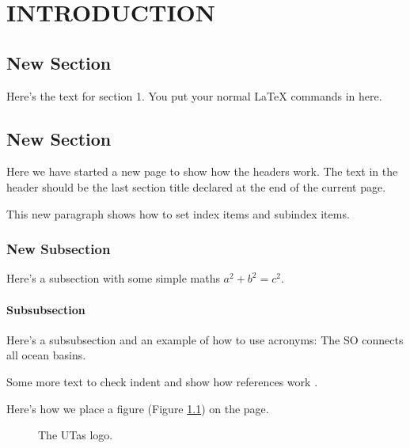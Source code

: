 

\chapter[Introduction]{INTRODUCTION}
\label{chap1}

\section{New Section}
Here's the text for section 1. You put your normal LaTeX commands
in here.

\newpage
\section{New Section}
Here we have started a new page to show how the headers work. The
text in the header should be the last section title declared at
the end of the current page.

This new paragraph shows how to set index items
and  subindex items.

\subsection{New Subsection}
Here's a subsection with some simple maths $a^2+b^2=c^2$.

\subsubsection{Subsubsection}
Here's a subsubsection and an example of how to use acronyms: The \ac{SO} connects all ocean basins.

\newpage
Some more text to check indent and show how references work
\cite{Williamson:STS}.

Here's how we place a figure (Figure \ref{fig:utas}) on the page.
\begin{figure}[hbtp]
\begin{center}
\caption{\label{fig:utas} The UTas logo.}
\end{center}
\end{figure}

